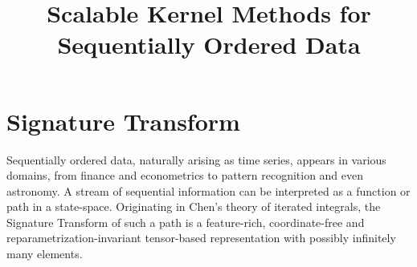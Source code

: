 \documentclass[openany]{book}
\title{Scalable Kernel Methods for Sequentially Ordered Data}
\begin{document}
\maketitle
\chapter{Signature Transform} 
Sequentially ordered data, naturally arising as time series, appears in various domains, from finance and econometrics to pattern recognition and even astronomy. A stream of sequential information can be interpreted as a function or path in a state-space. Originating in Chen’s theory of iterated integrals, the Signature Transform of such a path is a feature-rich, coordinate-free and reparametrization-invariant tensor-based representation with possibly infinitely many elements.
\end{document}
